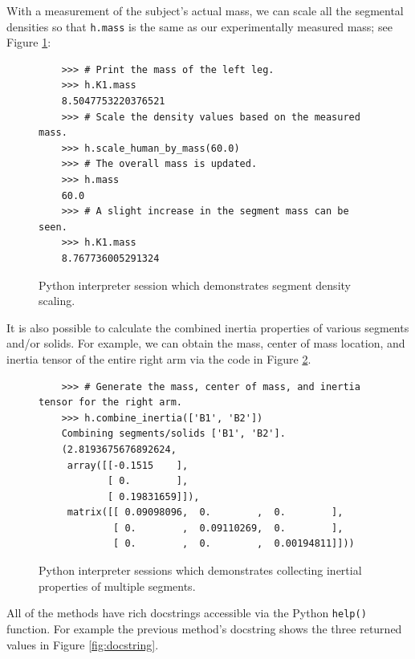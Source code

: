 \documentclass[10pt,a4paper,twocolumn]{article}
\begin{document}
With a measurement of the subject's actual mass, we can scale all the
segmental densities so that \verb+h.mass+ is the same as our
experimentally measured mass; see Figure \ref{fig:mass-scale-code}:

\begin{figure}
  \begin{verbatim}
    >>> # Print the mass of the left leg.
    >>> h.K1.mass
    8.5047753220376521
    >>> # Scale the density values based on the measured mass.
    >>> h.scale_human_by_mass(60.0)
    >>> # The overall mass is updated.
    >>> h.mass
    60.0
    >>> # A slight increase in the segment mass can be seen.
    >>> h.K1.mass
    8.767736005291324
  \end{verbatim}
  \caption{Python interpreter session which demonstrates segment density scaling.}
  \label{fig:mass-scale-code}
\end{figure}

It is also possible to calculate the combined inertia properties of various
segments and/or solids. For example, we can obtain the mass, center of mass location,
and inertia tensor of the entire right arm via the code in Figure \ref{fig:combine-inertia-code}.

\begin{figure}
  \begin{verbatim}
    >>> # Generate the mass, center of mass, and inertia tensor for the right arm.
    >>> h.combine_inertia(['B1', 'B2'])
    Combining segments/solids ['B1', 'B2'].
    (2.8193675676892624,
     array([[-0.1515    ],
            [ 0.        ],
            [ 0.19831659]]),
     matrix([[ 0.09098096,  0.        ,  0.        ],
             [ 0.        ,  0.09110269,  0.        ],
             [ 0.        ,  0.        ,  0.00194811]]))
    \end{verbatim}
    \caption{Python interpreter sessions which demonstrates collecting inertial properties of multiple segments.}
    \label{fig:combine-inertia-code}
\end{figure}

All of the methods have rich docstrings accessible via the Python
\verb+help()+ function. For example the previous method's docstring shows the three returned values in Figure \ref{fig:docstring}.
\end{document}
